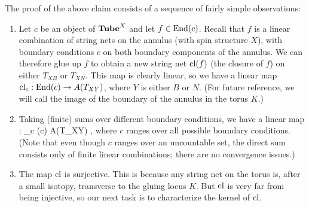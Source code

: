 The proof of the above claim consists of a sequence of fairly simple observations:
\begin{enumerate}

\item Let $c$ be an object of $\textbf{Tube}^X$ and let $f\in\text{End}(c)$.
Recall that $f$ is a linear combination of string nets on the annulus (with spin structure $X$), with boundary conditions
$c$ on both boundary components of the annulus.
We can therefore glue up $f$ to obtain a new string net $\text{cl}(f)$ (the closure of $f$) on either $T_{XB}$ or $T_{XN}$.
This map is clearly linear, so we have a linear map $\text{cl}_c : \text{End}(c) \to A(T_{XY})$, where $Y$ is either $B$ or $N$.
(For future reference, we will call the image of the boundary of the annulus in the torus $K$.)

\item Taking (finite) sums over different boundary conditions, we have a linear map
\be
	\cl : \bigoplus_c \End(c) \to A(T_{XY}) ,
\ee
where $c$ ranges over all possible boundary conditions.
(Note that even though $c$ ranges over an uncountable set, the direct sum consists only of finite linear combinations; 
there are no convergence issues.)

\item The map $\text{cl}$ is surjective.
This is because any string net on the torus is, after a small isotopy, 
transverse to the gluing locus $K$.
But $\text{cl}$ is very far from being injective, so our next task is to characterize the kernel of $\text{cl}$.


\end{enumerate}
